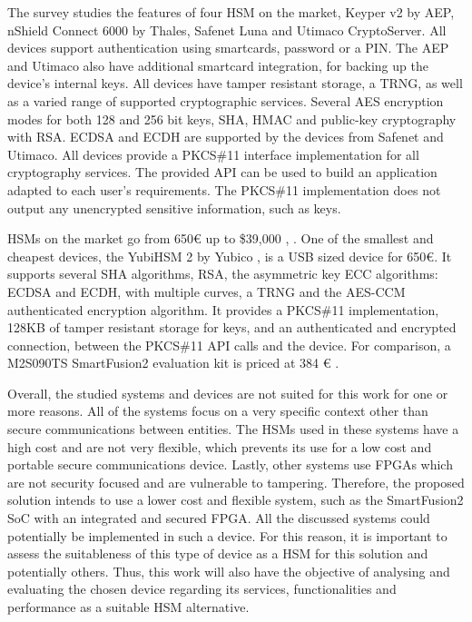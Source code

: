 The survey \cite{ivarsson2010review} studies the features of four \ac{HSM} on the market, Keyper v2 by AEP, nShield Connect 6000 by Thales, Safenet Luna and Utimaco CryptoServer.
All devices support authentication using smartcards, password or a PIN. The AEP and Utimaco also have additional smartcard integration, for backing up the device's internal keys.
All devices have tamper resistant storage, a \ac{TRNG}, as well as a varied range of supported cryptographic services. Several AES encryption modes for both 128 and 256 bit keys, SHA, HMAC and public-key cryptography with RSA.
ECDSA and ECDH are supported by the devices from Safenet and Utimaco.
All devices provide a PKCS\#11 interface implementation for all cryptography services. The provided API can be used to build an application adapted to each user's requirements. The PKCS\#11 implementation does not output any unencrypted sensitive information, such as keys.

HSMs on the market go from 650€ up to \$39,000 \cite{HSMpriceArticles}, \cite{HSMPresentationPrices}.
One of the smallest and cheapest devices, the YubiHSM 2 by Yubico \cite{YubiHSM2}, is a \ac{USB} sized device for 650€. It supports several SHA algorithms, RSA, the asymmetric key ECC algorithms: ECDSA and ECDH, with multiple curves, a \ac{TRNG} and the \ac{AES}-\ac{CCM} authenticated encryption algorithm.
It provides a PKCS\#11 implementation, 128KB of tamper resistant storage for keys, and an authenticated and encrypted connection, between the PKCS\#11 API calls and the device.
For comparison, a M2S090TS SmartFusion2 evaluation kit is priced at 384 € \cite{smartfusionPrice}.

Overall, the studied systems and devices are not suited for this work for one or more reasons. All of the systems focus on a very specific context other than secure communications between entities. The HSMs used in these systems have a high cost and are not very flexible, which prevents its use for a low cost and portable secure communications device. Lastly, other systems use FPGAs which are not security focused and are vulnerable to tampering. Therefore, the proposed solution intends to use a lower cost and flexible system, such as the SmartFusion2 SoC with an integrated and secured FPGA. All the discussed systems could potentially be implemented in such a device.
For this reason, it is important to assess the suitableness of this type of device as a HSM for this solution and potentially others. Thus, this work will also have the objective of analysing and evaluating the chosen device regarding its services, functionalities and performance as a suitable HSM alternative.
